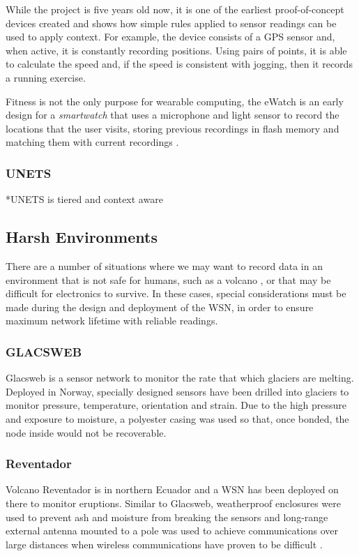 While the project is five years old now, it is one of the earliest proof-of-concept devices created and shows how simple rules applied to sensor readings can be used to apply context. For example, the device consists of a GPS sensor and, when active, it is constantly recording positions. Using pairs of points, it is able to calculate the speed and, if the speed is consistent with jogging, then it records a running exercise.

Fitness is not the only purpose for wearable computing, the eWatch is an early design for a \textit{smartwatch} that uses a microphone and light sensor to record the locations that the user visits, storing previous recordings in flash memory and matching them with current recordings \cite{Maurer}.

	\subsubsection{UNETS}
		*UNETS is tiered and context aware
\subsection{Harsh Environments}
	There are a number of situations where we may want to record data in an environment that is not safe for humans, such as a volcano \cite{Werner-Allen2006}, or that may be difficult for electronics to survive. In these cases, special considerations must be made during the design and deployment of the WSN, in order to ensure maximum  network lifetime with reliable readings.
	\subsubsection{GLACSWEB}
	Glacsweb is a sensor network to monitor the rate that which glaciers are melting. Deployed in Norway, specially designed sensors have been drilled into glaciers to monitor pressure, temperature, orientation and strain. Due to the high pressure and exposure to moisture, a polyester casing was used so that, once bonded, the node inside would not be recoverable.
	\subsubsection{Reventador}
	Volcano Reventador is in northern Ecuador and a WSN has been deployed on there to monitor eruptions. Similar to Glacsweb, weatherproof enclosures were used to prevent ash and moisture from breaking the sensors and long-range external antenna mounted to a pole was used to achieve communications over large distances when wireless communications have proven to be difficult \cite{Werner-Allen2006}.
